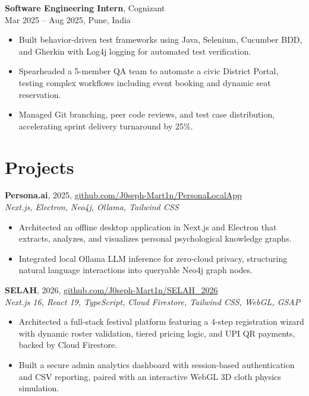 \documentclass[letterpaper,10pt]{article}
\begin{document}
\vspace{3pt}
\textbf{Software Engineering Intern}, Cognizant \\
Mar 2025 -- Aug 2025, Pune, India
\begin{itemize}
    \item Built behavior-driven test frameworks using Java, Selenium, Cucumber BDD, and Gherkin with Log4j logging for automated test verification.
    \item Spearheaded a 5-member QA team to automate a civic District Portal, testing complex workflows including event booking and dynamic seat reservation.
    \item Managed Git branching, peer code reviews, and test case distribution, accelerating sprint delivery turnaround by 25\%.
\end{itemize}

\section{Projects}

\vspace{2pt}
\textbf{Persona.ai}, 2025, \href{https://github.com/J0seph-Mart1n/PersonaLocalApp}{github.com/J0seph-Mart1n/PersonaLocalApp} \\
\textit{Next.js, Electron, Neo4j, Ollama, Tailwind CSS}
\begin{itemize}
    \item Architected an offline desktop application in Next.js and Electron that extracts, analyzes, and visualizes personal psychological knowledge graphs.
    \item Integrated local Ollama LLM inference for zero-cloud privacy, structuring natural language interactions into queryable Neo4j graph nodes.
\end{itemize}

\vspace{3pt}
\textbf{SELAH}, 2026, \href{https://github.com/J0seph-Mart1n/SELAH_2026}{github.com/J0seph-Mart1n/SELAH\_2026} \\
\textit{Next.js 16, React 19, TypeScript, Cloud Firestore, Tailwind CSS, WebGL, GSAP}
\begin{itemize}
    \item Architected a full-stack festival platform featuring a 4-step registration wizard with dynamic roster validation, tiered pricing logic, and UPI QR payments, backed by Cloud Firestore.
    \item Built a secure admin analytics dashboard with session-based authentication and CSV reporting, paired with an interactive WebGL 3D cloth physics simulation.
\end{itemize}
\end{document}
